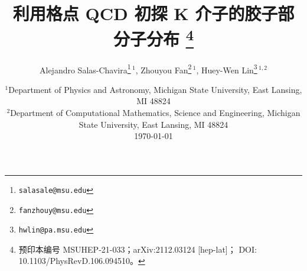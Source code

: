 \documentclass[11pt]{ctexart}
\begin{document}
\title{利用格点 QCD 初探 K 介子的胶子部分子分布%
  \thanks{预印本编号 MSUHEP-21-033；arXiv:2112.03124 [hep-lat]；
    DOI: 10.1103/PhysRevD.106.094510。}}

\author{Alejandro Salas-Chavira\thanks{\texttt{salasale@msu.edu}}\,$^{1}$,\quad
  Zhouyou Fan\thanks{\texttt{fanzhouy@msu.edu}}\,$^{1}$,\quad
  Huey-Wen Lin\thanks{\texttt{hwlin@pa.msu.edu}}\,$^{1,2}$}

\date{$^{1}$Department of Physics and Astronomy, Michigan State University,
  East Lansing, MI 48824\\[0.3em]
  $^{2}$Department of Computational Mathematics, Science and Engineering,
  Michigan State University, East Lansing, MI 48824\\[0.8em]
  \today}

\maketitle







\end{document}
